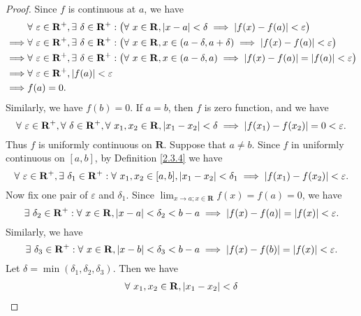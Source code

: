 \begin{proof}
    Since \(f\) is continuous at \(a\), we have
    \begin{align*}
                 & \forall\ \varepsilon \in \mathbf{R}^+, \exists\ \delta \in \mathbf{R}^+ : \big(\forall\ x \in \mathbf{R}, \abs*{x - a} < \delta \implies \abs*{f(x) - f(a)} < \varepsilon\big)               \\
        \implies & \forall\ \varepsilon \in \mathbf{R}^+, \exists\ \delta \in \mathbf{R}^+ : \big(\forall\ x \in \mathbf{R}, x \in (a - \delta, a + \delta) \implies \abs*{f(x) - f(a)} < \varepsilon\big)      \\
        \implies & \forall\ \varepsilon \in \mathbf{R}^+, \exists\ \delta \in \mathbf{R}^+ : \big(\forall\ x \in \mathbf{R}, x \in (a - \delta, a) \implies \abs*{f(x) - f(a)} = \abs*{f(a)} < \varepsilon\big) \\
        \implies & \forall\ \varepsilon \in \mathbf{R}^+, \abs*{f(a)} < \varepsilon                                                                                                                             \\
        \implies & f(a) = 0.
    \end{align*}
    Similarly, we have \(f(b) = 0\).
    If \(a = b\), then \(f\) is zero function, and we have
    \[
        \forall\ \varepsilon \in \mathbf{R}^+, \forall\ \delta \in \mathbf{R}^+, \forall\ x_1, x_2 \in \mathbf{R}, \abs*{x_1 - x_2} < \delta \implies \abs*{f(x_1) - f(x_2)} = 0 < \varepsilon.
    \]
    Thus \(f\) is uniformly continuous on \(\mathbf{R}\).
    Suppose that \(a \neq b\).
    Since \(f\) in uniformly continuous on \([a, b]\), by Definition \ref{2.3.4} we have
    \[
        \forall\ \varepsilon \in \mathbf{R}^+, \exists\ \delta_1 \in \mathbf{R}^+ : \forall\ x_1, x_2 \in [a, b], \abs*{x_1 - x_2} < \delta_1 \implies \abs*{f(x_1) - f(x_2)} < \varepsilon.
    \]
    Now fix one pair of \(\varepsilon\) and \(\delta_1\).
    Since \(\lim_{x \to a ; x \in \mathbf{R}} f(x) = f(a) = 0\), we have
    \[
        \exists\ \delta_2 \in \mathbf{R}^+ : \forall\ x \in \mathbf{R}, \abs*{x - a} < \delta_2 < b - a \implies \abs*{f(x) - f(a)} = \abs*{f(x)} < \varepsilon.
    \]
    Similarly, we have
    \[
        \exists\ \delta_3 \in \mathbf{R}^+ : \forall\ x \in \mathbf{R}, \abs*{x - b} < \delta_3 < b - a \implies \abs*{f(x) - f(b)} = \abs*{f(x)} < \varepsilon.
    \]
    Let \(\delta = \min(\delta_1, \delta_2, \delta_3)\).
    Then we have
    \begin{align*}
                 & \forall\ x_1, x_2 \in \mathbf{R}, \abs*{x_1 - x_2} < \delta \\

\end{align*}
\end{proof}
